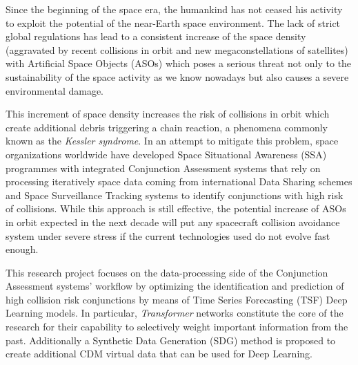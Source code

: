 


Since the beginning of the space era, the humankind has not ceased his activity to exploit the potential of the near-Earth space environment. The lack of strict global regulations has lead to a consistent increase of the space density (aggravated by recent collisions in orbit and new megaconstellations of satellites) with Artificial Space Objects (ASOs) which poses a serious threat not only to the sustainability of the  space activity as we know nowadays but also causes a severe environmental damage. 

This increment of space density increases the risk of collisions in orbit which create additional debris triggering a chain reaction, a phenomena commonly known as the \textit{Kessler syndrome}\cite{Kessler-1978-Debris-belt}. In an attempt to mitigate this problem, space organizations worldwide have developed Space Situational Awareness (SSA) programmes with integrated Conjunction Assessment systems that rely on processing iteratively space data coming from international Data Sharing schemes and Space Surveillance Tracking systems\cite{Merz-2021-CAServices}\cite{USSPACECOM-2009-SpaceTrack} to identify conjunctions with high risk of collisions. While this approach is still effective, the potential increase of ASOs in orbit expected in the next decade will put any spacecraft collision avoidance system under severe stress if the current technologies used do not evolve fast enough.


This research project focuses on the data-processing side of the Conjunction Assessment systems' workflow by optimizing the identification and prediction of high collision risk conjunctions by means of Time Series Forecasting (TSF) Deep Learning models. In particular, \textit{Transformer} networks constitute the core of the research for their capability to selectively weight important information from the past\cite{Shi-2022-TSF}. Additionally a Synthetic Data Generation (SDG) method is proposed to create additional CDM virtual data that can be used for Deep Learning.